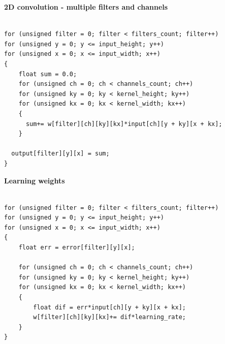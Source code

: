 \documentclass[xcolor=dvipsnames]{beamer}
\begin{document}
\begin{frame}[fragile]
{\bf 2D convolution - multiple filters and channels}


\begin{lstlisting}

for (unsigned filter = 0; filter < filters_count; filter++)
for (unsigned y = 0; y <= input_height; y++)
for (unsigned x = 0; x <= input_width; x++)
{
    float sum = 0.0;
    for (unsigned ch = 0; ch < channels_count; ch++)
    for (unsigned ky = 0; ky < kernel_height; ky++)
    for (unsigned kx = 0; kx < kernel_width; kx++)
    {
      sum+= w[filter][ch][ky][kx]*input[ch][y + ky][x + kx];
    }

  output[filter][y][x] = sum;
}

\end{lstlisting}
\end{frame}




\begin{frame}[fragile]
{\bf Learning weights}


\begin{lstlisting}

for (unsigned filter = 0; filter < filters_count; filter++)
for (unsigned y = 0; y <= input_height; y++)
for (unsigned x = 0; x <= input_width; x++)
{
    float err = error[filter][y][x];

    for (unsigned ch = 0; ch < channels_count; ch++)
    for (unsigned ky = 0; ky < kernel_height; ky++)
    for (unsigned kx = 0; kx < kernel_width; kx++)
    {
        float dif = err*input[ch][y + ky][x + kx];
        w[filter][ch][ky][kx]+= dif*learning_rate;
    }
}


\end{lstlisting}
\end{frame}
\end{document}
